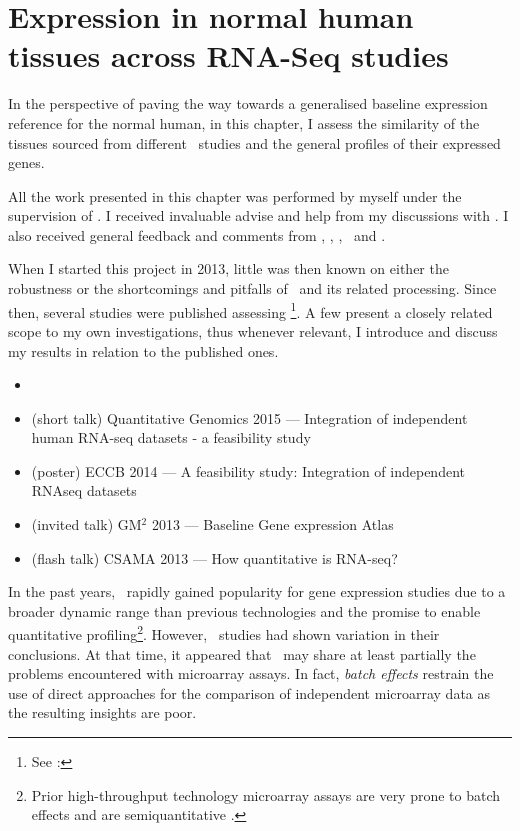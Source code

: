 \chapter{Expression in normal human tissues across RNA-Seq studies}
\label{ch:Transcriptomics}

In the perspective of paving the way towards
a generalised baseline expression reference for the normal human,
in this chapter, I assess the similarity
of the tissues sourced from different \Rnaseq\ studies and
the general profiles of their expressed genes.

All the work presented in this chapter was performed by myself under the
supervision of \alvis.
I received invaluable advise and help from my discussions with \nuno.
I also received general feedback and comments from \mar, \johan, \sarah, \gos\
and \wolfgang.

When I started this project in 2013,
little was then known on either the robustness or
the shortcomings and pitfalls of \Rnaseq\ and
its related processing.
Since then, several studies were published assessing \Rnaseq\footnote{See
\Cref{sec:TranssCoop}: \nameref{sec:TranssCoop}}.
A few present a closely related scope to my own investigations, thus
whenever relevant,
I introduce and discuss my results in relation to the published ones.


\derivativeWork{}
\begin{itemize}[topsep=0pt,nosep]
    \item {}
    \item (short talk) Quantitative Genomics 2015 --- Integration of
        independent human RNA-seq datasets - a feasibility study
    \item (poster) ECCB 2014 --- A feasibility study:
        Integration of independent RNAseq datasets
    \item (invited talk) GM$^2$ 2013 --- Baseline Gene expression Atlas
    \item (flash talk) CSAMA 2013 --- How quantitative is RNA-seq?
\end{itemize}
\clearpage

In the past years,
\Rnaseq\ rapidly gained popularity
for gene expression studies
due to a broader dynamic range than previous technologies
and the promise to enable quantitative profiling\footnote{%
Prior high-throughput technology microarray assays are very prone
to batch effects and are semiquantitative \mycite{lee:2006}.
}.
However, \Rnaseq\ studies had shown variation in their conclusions. 
At that time,
it appeared that
\Rnaseq\ may share at least partially the problems encountered
with microarray assays.
In fact, \emph{batch effects} restrain the use of direct approaches
for the comparison of independent microarray data
as the resulting insights are poor.

